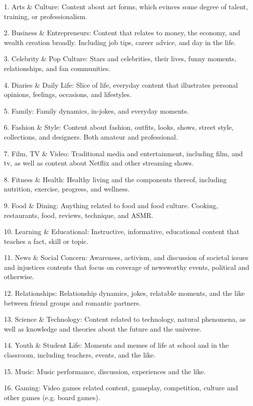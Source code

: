 1. Arts \& Culture: Content about art forms, which evinces some degree of talent, training, or professionalism.

2. Business \& Entrepreneurs: Content that relates to money, the economy, and wealth creation broadly. Including job tips, career advice, and day in the life.

3. Celebrity \& Pop Culture: Stars and celebrities, their lives, funny moments, relationships, and fan communities.

4. Diaries \& Daily Life: Slice of life, everyday content that illustrates personal opinions, feelings, occasions, and lifestyles.

5. Family: Family dynamics, in-jokes, and everyday moments.

6. Fashion \& Style: Content about fashion, outfits, looks, shows, street style, collections, and designers. Both amateur and professional.

7. Film, TV \& Video: Traditional media and entertainment, including film, and tv, as well as content about Netflix and other streaming shows.

8. Fitness \& Health: Healthy living and the components thereof, including nutrition, exercise, progress, and wellness.

9. Food \& Dining: Anything related to food and food culture. Cooking, restaurants, food, reviews, technique, and ASMR. 

10. Learning \& Educational: Instructive, informative, educational content that teaches a fact, skill or topic.

11. News \& Social Concern: Awareness, activism, and discussion of societal issues and injustices contents that focus on coverage of newsworthy events, political and otherwise.

12. Relationships: Relationship dynamics, jokes, relatable moments, and the like between friend groups and romantic partners.

13. Science \& Technology: Content related to technology, natural phenomena, as well as knowledge and theories about the future and the universe.

14. Youth \& Student Life: Moments and memes of life at school and in the classroom, including teachers, events, and the like.

15. Music: Music performance, discussion, experiences and the like.

16. Gaming: Video games related content, gameplay, competition, culture and other games (e.g. board games). 

